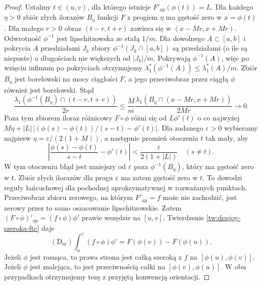 \begin{proof}
Ustalmy $t\in(u,v)$, dla którego istnieje $F'_{\mathrm{ap}}(\phi(t))=L$. Dla każdego $\eta>0$ zbiór złych ilorazów $B_\eta$ funkcji $F$ z progiem $\eta$ ma gęstość zero w $x=\phi(t)$. Dla małego $r>0$ obraz $(t-r,t+r)$ zawiera się w $(x-Mr,x+Mr)$. Odwrotność $\phi^{-1}$ jest lipschitzowska ze stałą $1/m$.
Dla dowolnego $A\subset[a,b]$ i pokrycia $A$ przedziałami
$J_k$ zbiory $\phi^{-1}(J_k\cap[a,b])$ są przedziałami
(o ile są niepuste) o długościach nie większych od $|J_k|/m$.
Pokrywają $\phi^{-1}(A)$, więc po wzięciu infimum po pokryciach
otrzymujemy $\lambda_1^*(\phi^{-1}(A))\le\lambda_1^*(A)/m$. Zbiór $B_\eta$ jest borelowski na mocy ciągłości $F$, a jego przeciwobraz przez ciągłą $\phi$ również jest borelowski. Stąd
\[
 \frac{\lambda_1(\phi^{-1}(B_\eta)\cap(t-r,t+r))}{2r}
 \le \frac{M}{m}
 \frac{\lambda_1(B_\eta\cap(x-Mr,x+Mr))}{2Mr}\longrightarrow0.
\]
Poza tym zbiorem iloraz różnicowy $F\circ\phi$ różni się od $L\phi'(t)$ o co najwyżej $M\eta+|L|\,|(\phi(s)-\phi(t))/(s-t)-\phi'(t)|$. Dla zadanego $\varepsilon>0$ wybieramy najpierw
$\eta=\varepsilon/(2(1+M))$, a następnie promień
otoczenia $t$ tak mały, aby
\[
 \left|\frac{\phi(s)-\phi(t)}{s-t}-\phi'(t)\right|
 <\frac{\varepsilon}{2(1+|L|)}
 \quad (s\ne t).
\]
W tym otoczeniu błąd jest mniejszy od $\varepsilon$
poza $\phi^{-1}(B_\eta)$, który ma gęstość zero w $t$.
Zbiór złych ilorazów dla progu $\varepsilon$ ma zatem
gęstość zero w $t$. To dowodzi reguły łańcuchowej
dla pochodnej aproksymatywnej w rozważanych punktach. Przeciwobraz zbioru zerowego, na którym $F'_{\mathrm{ap}}=f$ może nie zachodzić, jest zerowy przez to samo oszacowanie lipschitzowskie. Zatem $(F\circ\phi)'_{\mathrm{ap}}=(f\circ\phi)\phi'$
prawie wszędzie na $[u,v]$. Twierdzenie
\ref{tw:denjoy-szeroka-ftc} daje
\[
 (\mathrm D_{\mathrm{sz}})\int_u^v(f\circ\phi)\phi'
 =F(\phi(v))-F(\phi(u)).
\]
Jeżeli $\phi$ jest rosnąca, to prawa strona jest
całką szeroką z $f$ na $[\phi(u),\phi(v)]$.
Jeżeli $\phi$ jest malejąca, to jest przeciwnością
całki na $[\phi(v),\phi(u)]$. W obu przypadkach
otrzymujemy tezę z przyjętą konwencją orientacji.
\end{proof}

